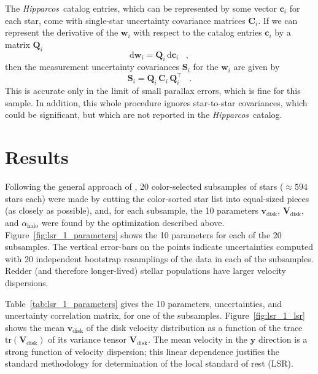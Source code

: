 \documentclass[12pt,preprint]{aastex}
\newcommand{\Hipparcos}{\textit{Hipparcos}}
\renewcommand{\vec}[1]{\mathbf{#1}} %
\newcommand{\cc}{\vec{c}}
\newcommand{\vv}{\vec{v}}
\newcommand{\ww}{\vec{w}}
\newcommand{\cci}{\cc_i}
\newcommand{\eey}{\vec{\hat{y}}}
\newcommand{\vvdisk}{\vv_\mathrm{disk}}
\newcommand{\wwi}{\ww_i}
\newcommand{\ten}[1]{\mathbf{#1}} %
\newcommand{\CC}{\ten{C}}
\newcommand{\QQ}{\ten{Q}}
\renewcommand{\SS}{\ten{S}}
\newcommand{\VV}{\ten{V}}
\newcommand{\CCi}{\CC_i}
\newcommand{\QQi}{\QQ_i}
\newcommand{\SSi}{\SS_i}
\newcommand{\VVdisk}{\VV_\mathrm{\!disk}}
\newcommand{\T}{^{\scriptscriptstyle \top}}   %
\newcommand{\tr}{\mathrm{tr}}                 %
\newcommand{\alphahalo}{\alpha_\mathrm{halo}}
\begin{document}
The \Hipparcos\ catalog entries, which can be represented by some
vector $\cci$ for each star, come with single-star uncertainty
covariance matrices $\CCi$.  If we can represent the derivative of the
$\wwi$ with respect to the catalog entries $\cci$ by a matrix $\QQi$
\begin{equation}
\mathrm{d}\wwi = \QQi\,\mathrm{d}\cci \;\;\;,
\end{equation}
then the measurement uncertainty covariances $\SSi$ for the $\wwi$ are
given by
\begin{equation}
\SSi = \QQi\,\CCi\,\QQi\T \;\;\;.
\end{equation}
This is accurate only in the limit of small parallax errors, which is
fine for this sample.  In addition, this whole procedure ignores
star-to-star covariances, which could be significant, but which are
not reported in the \Hipparcos\ catalog.

\section{Results}

Following the general approach of \cite{dehnen98a}, 20 color-selected
subsamples of stars ($\approx 594$ stars each) were made by cutting
the color-sorted star list into equal-sized pieces (as closely as
possible), and, for each subsample, the 10 parameters $\vvdisk$,
$\VVdisk$, and $\alphahalo$ were found by the optimization described
above.  Figure~\ref{fig:lsr_1_parameters} shows the 10 parameters for
each of the 20 subsamples.  The vertical error-bars on the points
indicate uncertainties computed with 20 independent bootstrap
resamplings of the data in each of the subsamples.  Redder (and
therefore longer-lived) stellar populations have larger velocity
dispersions.

Table~\ref{tab:lsr_1_parameters} gives the 10 parameters,
uncertainties, and uncertainty correlation matrix, for one of the
subsamples.  Figure~\ref{fig:lsr_1_lsr} shows the mean $\vvdisk$ of
the disk velocity distribution as a function of the trace
$\tr(\VVdisk)$ of its variance tensor $\VVdisk$.  The mean velocity in
the $\eey$ direction is a strong function of velocity dispersion; this
linear dependence justifies the standard methodology for determination
of the local standard of rest (LSR).
\end{document}
